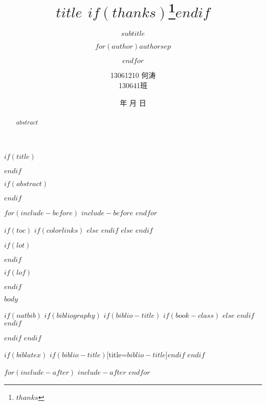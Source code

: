 \documentclass[$if(fontsize)$$fontsize$,$endif$$if(lang)$$babel-lang$,$endif$$if(papersize)$$papersize$paper,$endif$$for(classoption)$$classoption$$sep$,$endfor$]{report} %
\title{\huge $title$ $if(thanks)$\thanks{$thanks$}$endif$}
\subtitle{$subtitle$}
\author{$for(author)$$author$$sep$ \and $endfor$}
\author{13061210 \quad 何涛 \\ 130641班}
\institute{$for(institute)$$institute$$sep$ \and $endfor$}
\date{\number\year 年 \number\month 月 \number\day 日}
\begin{document}
$if(title)$
    \maketitle
$endif$

$if(abstract)$
    \begin{abstract}
    $abstract$
    \end{abstract}
$endif$

$for(include-before)$
    $include-before$
$endfor$

$if(toc)$
{
    $if(colorlinks)$
        \hypersetup{linkcolor=$if(toccolor)$$toccolor$$else$black$endif$}
    $else$
        \hypersetup{colorlinks=true,linktoc=all,linkcolor=black}
    $endif$
    \setcounter{tocdepth}{$toc-depth$}
    \tableofcontents
}
$else$
    \renewcommand{\contentsname}{目\qquad 录}
    \tableofcontents
    \clearpage
$endif$

$if(lot)$
    \listoftables
$endif$

$if(lof)$
    \listoffigures
$endif$

$body$

$if(natbib)$
    $if(bibliography)$
        $if(biblio-title)$
            $if(book-class)$
                \renewcommand\bibname{$biblio-title$}
            $else$
                \renewcommand\refname{$biblio-title$}
            $endif$
        $endif$
        
    $endif$
$endif$

$if(biblatex)$
    \printbibliography$if(biblio-title)$[title=$biblio-title$]$endif$
$endif$

$for(include-after)$
    $include-after$
$endfor$
\end{document}
